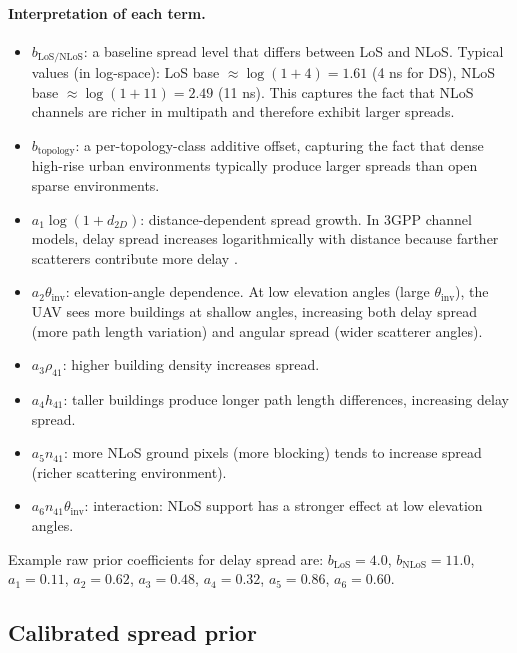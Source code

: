 \documentclass[11pt,a4paper]{article}
\begin{document}
\paragraph{Interpretation of each term.}
\begin{itemize}
\item $b_{\mathrm{LoS/NLoS}}$: a baseline spread level that differs between
      LoS and NLoS. Typical values (in log-space): LoS base $\approx
      \log(1 + 4) = 1.61$ (4 ns for DS), NLoS base $\approx \log(1 + 11) =
      2.49$ (11 ns). This captures the fact that NLoS channels are richer in
      multipath and therefore exhibit larger spreads.
\item $b_{\mathrm{topology}}$: a per-topology-class additive offset, capturing
      the fact that dense high-rise urban environments typically produce larger
      spreads than open sparse environments.
\item $a_1 \log(1+d_{2D})$: distance-dependent spread growth. In 3GPP
      channel models, delay spread increases logarithmically with distance
      because farther scatterers contribute more delay \cite{tr38901}.
\item $a_2 \theta_{\mathrm{inv}}$: elevation-angle dependence. At low
      elevation angles (large $\theta_{\mathrm{inv}}$), the UAV sees more
      buildings at shallow angles, increasing both delay spread (more path
      length variation) and angular spread (wider scatterer angles).
\item $a_3 \rho_{41}$: higher building density increases spread.
\item $a_4 h_{41}$: taller buildings produce longer path length differences,
      increasing delay spread.
\item $a_5 n_{41}$: more NLoS ground pixels (more blocking) tends to increase
      spread (richer scattering environment).
\item $a_6 n_{41}\theta_{\mathrm{inv}}$: interaction: NLoS support has a
      stronger effect at low elevation angles.
\end{itemize}

Example raw prior coefficients for delay spread are:
$b_{\mathrm{LoS}} = 4.0$, $b_{\mathrm{NLoS}} = 11.0$,
$a_1 = 0.11$, $a_2 = 0.62$, $a_3 = 0.48$, $a_4 = 0.32$, $a_5 = 0.86$,
$a_6 = 0.60$.

\subsection{Calibrated spread prior}
\end{document}
